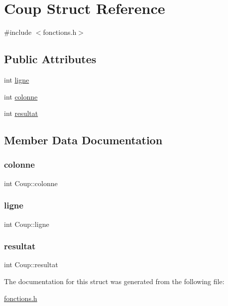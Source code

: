 \hypertarget{structCoup}{}\section{Coup Struct Reference}
\label{structCoup}


{\ttfamily \#include $<$fonctions.\+h$>$}

\subsection*{Public Attributes}
\begin{DoxyCompactItemize}
\item 
int \hyperlink{structCoup_a742fec4d6f2e479b396c8e1570e58840}{ligne}
\item 
int \hyperlink{structCoup_ad2cbc4c902d39eb6714567d624b13152}{colonne}
\item 
int \hyperlink{structCoup_ad1fc037348bc7e3e3f820cf0bacc14a4}{resultat}
\end{DoxyCompactItemize}


\subsection{Member Data Documentation}
\hypertarget{structCoup_ad2cbc4c902d39eb6714567d624b13152}{}\label{structCoup_ad2cbc4c902d39eb6714567d624b13152} 
\subsubsection{\texorpdfstring{colonne}{colonne}}
{\footnotesize\ttfamily int Coup\+::colonne}

\hypertarget{structCoup_a742fec4d6f2e479b396c8e1570e58840}{}\label{structCoup_a742fec4d6f2e479b396c8e1570e58840} 
\subsubsection{\texorpdfstring{ligne}{ligne}}
{\footnotesize\ttfamily int Coup\+::ligne}

\hypertarget{structCoup_ad1fc037348bc7e3e3f820cf0bacc14a4}{}\label{structCoup_ad1fc037348bc7e3e3f820cf0bacc14a4} 
\subsubsection{\texorpdfstring{resultat}{resultat}}
{\footnotesize\ttfamily int Coup\+::resultat}



The documentation for this struct was generated from the following file\+:\begin{DoxyCompactItemize}
\item 
\hyperlink{fonctions_8h}{fonctions.\+h}\end{DoxyCompactItemize}
